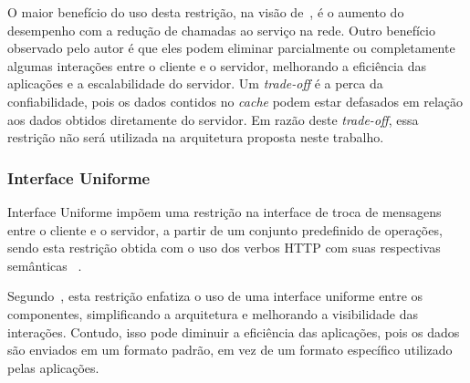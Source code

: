 O maior benefício do uso desta restrição, 
na visão de~\cite{fielding2000architectural, kalin2013java, richardson2008restful}, é o aumento do desempenho com a 
redução de chamadas ao serviço na rede. Outro benefício observado pelo autor é que eles podem eliminar parcialmente ou 
completamente algumas interações entre o cliente e o servidor, melhorando a eficiência das aplicações e a escalabilidade do servidor. 
Um \textit{trade-off} é a perca da confiabilidade, pois os dados contidos no \textit{cache} podem estar defasados em relação aos 
dados obtidos diretamente do servidor. Em razão deste \textit{trade-off}, essa restrição não será utilizada na arquitetura proposta neste trabalho.


\subsubsection{Interface Uniforme} 

Interface Uniforme impõem uma restrição na interface de troca de mensagens
entre o cliente e o servidor, 
a partir de um conjunto predefinido de 
operações, sendo 
esta restrição obtida com o uso dos verbos \acrshort{HTTP} 
com suas respectivas semânticas
~\cite{fielding1999rfc, flanders2008restful, ModelDriApproRest:2014, RestApiDesign:2011}. 

Segundo~\cite{fielding2000architectural, flanders2008restful}, 
esta restrição enfatiza o uso de uma interface uniforme entre os componentes, 
simplificando a arquitetura e melhorando a visibilidade das interações. Contudo, isso pode diminuir a eficiência das aplicações, 
pois os dados são enviados em um formato padrão, em vez de um formato específico utilizado pelas aplicações.

